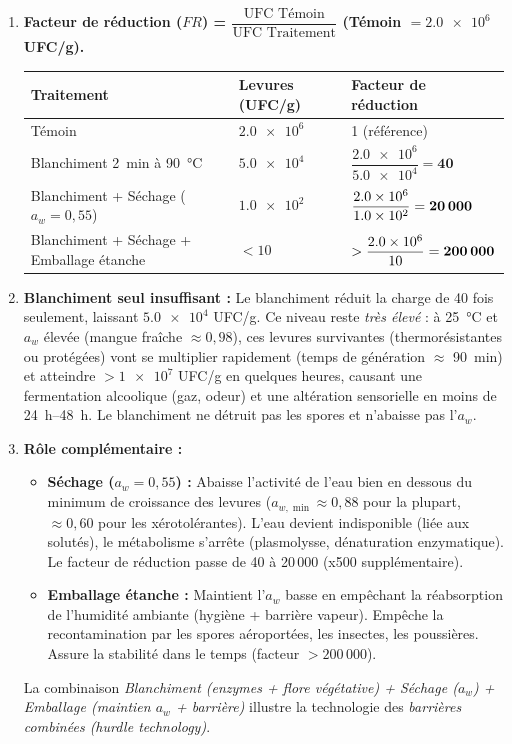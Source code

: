 \documentclass[11pt]{article}
\begin{document}
\begin{corrige}
\begin{enumerate}
\item \textbf{Facteur de réduction ($FR$) = $\dfrac{\text{UFC Témoin}}{\text{UFC Traitement}}$ (Témoin $= \num{2,0e6}$ UFC/g).}
\begin{center}
\begin{tabularx}{\linewidth}{|l|X|X|}\hline
\rowcolor{popblueL} \textbf{Traitement} & \textbf{Levures (UFC/g)} & \textbf{Facteur de réduction} \\ \hline
Témoin & $\num{2,0e6}$ & 1 (référence) \\ \hline
Blanchiment \SI{2}{\minute} à \SI{90}{\degreeCelsius} & $\num{5,0e4}$ & $\dfrac{\num{2,0e6}}{\num{5,0e4}} = \textbf{40}$ \\ \hline
Blanchiment + Séchage ($a_w = 0,55$) & $\num{1,0e2}$ & $\dfrac{\num{2,0e6}}{\num{1,0e2}} = \textbf{20\,000}$ \\ \hline
Blanchiment + Séchage + Emballage étanche & $< 10$ & $> \dfrac{\num{2,0e6}}{10} = \textbf{200\,000}$ \\ \hline
\end{tabularx}
\end{center}

\item \textbf{Blanchiment seul insuffisant :}
Le blanchiment réduit la charge de 40 fois seulement, laissant $\num{5,0e4}$ UFC/g. Ce niveau reste \emph{très élevé} : à \SI{25}{\degreeCelsius} et $a_w$ élevée (mangue fraîche $\approx 0,98$), ces levures survivantes (thermorésistantes ou protégées) vont se multiplier rapidement (temps de génération $\approx$ \SI{90}{\minute}) et atteindre $> \num{1e7}$ UFC/g en quelques heures, causant une fermentation alcoolique (gaz, odeur) et une altération sensorielle en moins de \SI{24}{\hour}--\SI{48}{\hour}. Le blanchiment ne détruit pas les spores et n'abaisse pas l'$a_w$.

\item \textbf{Rôle complémentaire :}
\begin{itemize}
\item \textbf{Séchage ($a_w = 0,55$) :} Abaisse l'activité de l'eau bien en dessous du minimum de croissance des levures ($a_{w,\min} \approx 0,88$ pour la plupart, $\approx 0,60$ pour les xérotolérantes). L'eau devient indisponible (liée aux solutés), le métabolisme s'arrête (plasmolysse, dénaturation enzymatique). Le facteur de réduction passe de 40 à 20\,000 (x500 supplémentaire).
\item \textbf{Emballage étanche :} Maintient l'$a_w$ basse en empêchant la réabsorption de l'humidité ambiante (hygiène + barrière vapeur). Empêche la recontamination par les spores aéroportées, les insectes, les poussières. Assure la stabilité dans le temps (facteur $> 200\,000$).
\end{itemize}
La combinaison \emph{Blanchiment (enzymes + flore végétative) + Séchage ($a_w$) + Emballage (maintien $a_w$ + barrière)} illustre la technologie des \emph{barrières combinées (hurdle technology)}.
\end{enumerate}
\end{corrige}
\end{document}

